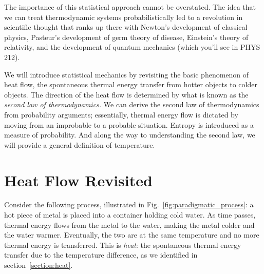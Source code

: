 
The importance of this statistical approach cannot be overstated.
The idea that we can treat thermodynamic systems probabilistically
led to a revolution in scientific thought that ranks up there
with Newton's development of classical physics, Pasteur's development
of germ theory of disease, Einstein's theory of relativity, and
the development of quantum mechanics (which you'll see in PHYS 212).

We will introduce statistical mechanics by revisiting the basic phenomenon
of heat flow, the spontaneous thermal energy transfer from hotter objects
to colder objects.  The direction of the heat flow is determined by what
is known as the {\it second law of thermodynamics.}  We can derive the
second law of thermodynamics from probability arguments; essentially,
thermal energy flow is dictated by moving from an improbable to a
probable situation.  Entropy is introduced as a measure of probability.
And along the way to understanding the second law, we will provide a
general definition of temperature.

\section{Heat Flow Revisited}

Consider the following process, illustrated in
Fig.~\ref{fig:paradigmatic_process}: a hot piece of metal is placed
into a container holding cold water.  As time passes, thermal energy
flows from the metal to the water, making the metal colder and the
water warmer.  Eventually, the two are at the same temperature and no
more thermal energy is transferred.  This is {\it heat\/}: the
spontaneous thermal energy transfer due to the temperature difference,
as we identified in section~\ref{section:heat}.

